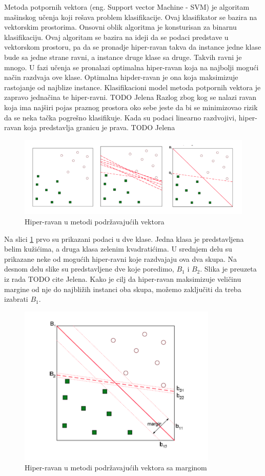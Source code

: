 \documentclass[12pt,oneside]{memoir}
\begin{document}
Metoda potpornih vektora (eng.  Support vector Machine - SVM) je algoritam mašinskog učenja koji rešava problem klasifikacije.  Ovaj klasifikator se bazira na vektorskim prostorima.  Onsovni oblik algoritma je konsturisan za binarnu klasifikaciju.  
Ovaj algoritam se bazira na ideji da se podaci predstave u vektorskom prostoru, pa da se pronadje hiper-ravan takva da instance jedne klase bude sa jedne strane ravni,  a instance druge klase sa druge.  Takvih ravni je mnogo.
U fazi učenja se pronalazi optimalna hiper-ravan koja na najbolji mogući način razdvaja ove klase.  Optimalna hipder-ravan je ona koja maksimizuje rastojanje od najblize instance.  Klasifikacioni model metoda potpornih vektora je zapravo jednačina te hiper-ravni.   TODO Jelena Razlog zbog kog se nalazi ravan koja ima najširi pojas praznog prostora oko sebe jeste da bi se minimizovao rizik da se neka tačka pogrešno klasifikuje.  Kada su podaci linearno razdvojivi, hiper-ravan koja predstavlja granicu je prava.  TODO Jelena

\begin{figure}[h!]
\centering
\includegraphics[width=.7\textwidth]{images/svm.png}
\caption{ Hiper-ravan u metodi podržavajućih vektora }
\label{img:svm_1}
\end{figure}

Na slici \ref{img:svm_1} prvo su prikazani podaci u dve klase.  Jedna klasa je predstavljena belim kužićima,  a druga klasa zelenim kvadratićima.  U srednjem delu su prikazane neke od mogućih hiper-ravni koje razdvajaju ova dva skupa.  Na desnom delu slike su predstavljene dve koje poredimo,  $B_1$ i $B_2$. Slika je preuzeta iz rada TODO cite Jelena.  Kako je cilj da hiper-ravan maksimizuje veličinu margine od nje do najbližih instanci oba skupa, možemo zaključiti da treba izabrati $B_1$. 

\begin{figure}[h!]
\centering
\includegraphics[width=.7\textwidth]{images/svm1.png}
\caption{ Hiper-ravan u metodi podržavajućih vektora sa marginom }
\label{img:svm_2}
\end{figure}
\end{document}
